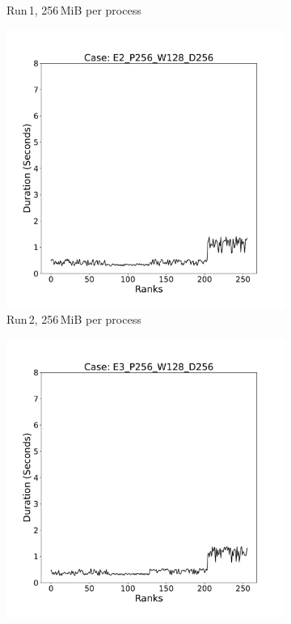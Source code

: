 \begin{figure}
\begin{subfigure}[b]{0.3\textwidth}
         \caption{Run\,1, 256\,MiB per process }
         \label{fig:E1_256}
     \end{subfigure}
     \hfill
     \begin{subfigure}[b]{0.3\textwidth}
         \centering
         \includegraphics[width=\textwidth, height=\textwidth]{figures/E2_P256_W128_D256.pdf}
         \caption{Run\,2, 256\,MiB per process}
         \label{fig:E2_256}
     \end{subfigure}
      \hfill
     \begin{subfigure}[b]{0.3\textwidth}
         \centering
         \includegraphics[width=\textwidth, height=\textwidth]{figures/E3_P256_W128_D256.pdf}

\end{subfigure}
\end{figure}
